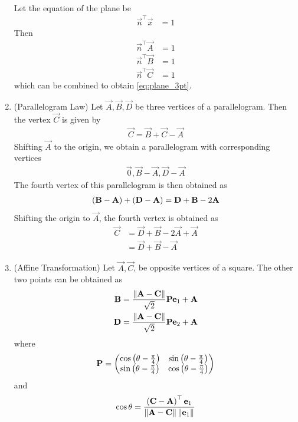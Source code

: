 \documentclass[journal,12pt,onecolumn]{IEEEtran}
\renewcommand\thesection{\arabic{section}}
\renewcommand\thesubsection{\thesection.\arabic{subsection}}
\begin{document}
\begin{enumerate}[label=\thesubsection.\arabic*.,ref=\thesubsection.\theenumi]
\begin{align}
	\label{eq:plane_3pt}
\end{align}
\solution Let the equation of the plane be 
\begin{align}
	\vec{n}^{\top}	\vec{x} &= 1
\end{align}
Then 
\begin{align}
	\vec{n}^{\top}	\vec{A} &= 1
	\\
	\vec{n}^{\top}	\vec{B} &= 1
	\\
	\vec{n}^{\top}	\vec{C} &= 1
\end{align}
which can be combined to obtain 
	\eqref{eq:plane_3pt}.
%
\item (Parallelogram Law)  Let $\vec{A}, \vec{B}, \vec{D}$ be three vertices of a parallelogram.  Then the vertex $\vec{C}$ is given by 
\begin{align}
  \label{eq:pgm_law}
  \vec{C} = \vec{B}+\vec{C} - \vec{A}
\end{align}
		\solution Shifting $\vec{A}$ to the origin, we obtain a parallelogram with corresponding vertices 
\begin{align}
  \label{eq:pgm_law_org_vert}
  \vec{0}, \vec{B}-\vec{A}, \vec{D} - \vec{A}
\end{align}
The fourth vertex of this parallelogram is then obtained as 
\begin{align}
  \label{eq:pgm_law_org}
	\left(\mathbf{B}-\mathbf{A}\right)+\left( \mathbf{D} - \mathbf{A}\right) = \mathbf{D}+ \mathbf{B} - 2\mathbf{A}
\end{align}
Shifting the origin to $\vec{A}$, the fourth vertex is obtained as 
\begin{align}
  \label{eq:pgm_law_org_C}
		 \vec{C} &= \vec{D}+ \vec{B} - 2\vec{A}+\vec{A} 
		 \\
	 &=
	 \vec{D}+ \vec{B} - \vec{A} 
\end{align}
\item (Affine Transformation) Let $\vec{A},\vec{C}$, be opposite vertices of a square. The other two points can be obtained as  
\begin{align}
  \label{eq:square_points}
  \mathbf{B} = \frac{\left\lVert\mathbf{A}-\mathbf{C}\right\rVert}{\sqrt{2}} \mathbf{P}\mathbf{e}_1+\mathbf{A}
  \\
  \mathbf{D} = \frac{\left\lVert\mathbf{A}-\mathbf{C}\right\rVert}{\sqrt{2}} \mathbf{P}\mathbf{e}_2+\mathbf{A}
\end{align}
where 
\begin{align}
	\mathbf{P} = \begin{pmatrix}\cos \left(\theta-\frac{\pi}{4}\right) & \sin  \left(\theta-\frac{\pi}{4}\right) \\ \sin \left(\theta-\frac{\pi}{4}\right) & \cos \left(\theta-\frac{\pi}{4}\right)\end{pmatrix}
\end{align}
and 
\begin{align}
	\cos\theta = \frac{\left(\mathbf{C}-\mathbf{A}\right)^{\top}\mathbf{e}_1}{\left\lVert\mathbf{A}-\mathbf{C}\right\rVert\left\lVert\mathbf{e}_1\right\rVert}
\end{align}
\end{enumerate}
\end{document}
